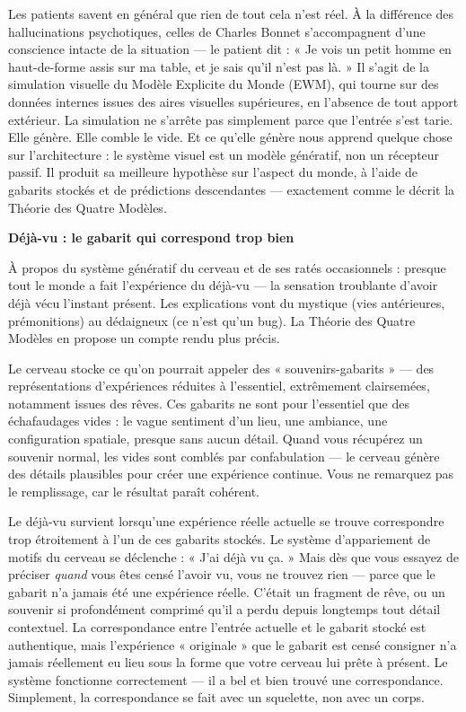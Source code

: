 \documentclass[11pt, twoside, openright]{book}
\begin{document}
Les patients savent en général que rien de tout cela n'est réel. À la différence des hallucinations psychotiques, celles de Charles Bonnet s'accompagnent d'une conscience intacte de la situation --- le patient dit : « Je vois un petit homme en haut-de-forme assis sur ma table, et je sais qu'il n'est pas là. » Il s'agit de la simulation visuelle du Modèle Explicite du Monde (EWM), qui tourne sur des données internes issues des aires visuelles supérieures, en l'absence de tout apport extérieur. La simulation ne s'arrête pas simplement parce que l'entrée s'est tarie. Elle génère. Elle comble le vide. Et ce qu'elle génère nous apprend quelque chose sur l'architecture : le système visuel est un modèle génératif, non un récepteur passif. Il produit sa meilleure hypothèse sur l'aspect du monde, à l'aide de gabarits stockés et de prédictions descendantes --- exactement comme le décrit la Théorie des Quatre Modèles.

\textbf{Déjà-vu : le gabarit qui correspond trop bien}

À propos du système génératif du cerveau et de ses ratés occasionnels : presque tout le monde a fait l'expérience du déjà-vu --- la sensation troublante d'avoir déjà vécu l'instant présent. Les explications vont du mystique (vies antérieures, prémonitions) au dédaigneux (ce n'est qu'un bug). La Théorie des Quatre Modèles en propose un compte rendu plus précis.

Le cerveau stocke ce qu'on pourrait appeler des « souvenirs-gabarits » --- des représentations d'expériences réduites à l'essentiel, extrêmement clairsemées, notamment issues des rêves. Ces gabarits ne sont pour l'essentiel que des échafaudages vides : le vague sentiment d'un lieu, une ambiance, une configuration spatiale, presque sans aucun détail. Quand vous récupérez un souvenir normal, les vides sont comblés par confabulation --- le cerveau génère des détails plausibles pour créer une expérience continue. Vous ne remarquez pas le remplissage, car le résultat paraît cohérent.

Le déjà-vu survient lorsqu'une expérience réelle actuelle se trouve correspondre trop étroitement à l'un de ces gabarits stockés. Le système d'appariement de motifs du cerveau se déclenche : « J'ai déjà vu ça. » Mais dès que vous essayez de préciser \textit{quand} vous êtes censé l'avoir vu, vous ne trouvez rien --- parce que le gabarit n'a jamais été une expérience réelle. C'était un fragment de rêve, ou un souvenir si profondément comprimé qu'il a perdu depuis longtemps tout détail contextuel. La correspondance entre l'entrée actuelle et le gabarit stocké est authentique, mais l'expérience « originale » que le gabarit est censé consigner n'a jamais réellement eu lieu sous la forme que votre cerveau lui prête à présent. Le système fonctionne correctement --- il a bel et bien trouvé une correspondance. Simplement, la correspondance se fait avec un squelette, non avec un corps.
\end{document}
